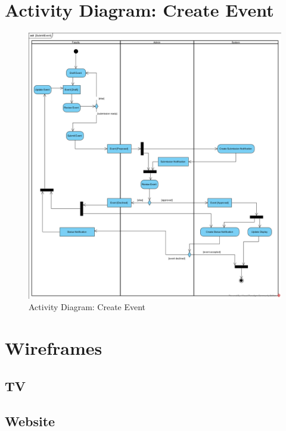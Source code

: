 \documentclass{article}
\begin{document}
\section{Activity Diagram: Create Event}
\begin{figure}[H]
    \centering
    \includegraphics[width=.98\textwidth]{images/SubmitEvent.png}
    \centering
    \caption{Activity Diagram: Create Event}
    \label{fig:activityDiagram}
\end{figure}
\section{Wireframes}
\subsection{TV}

\subsection{Website}
\end{document}
